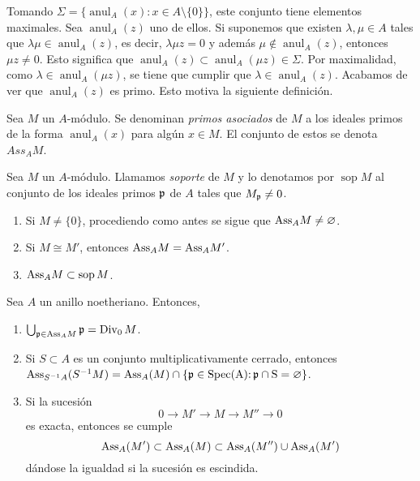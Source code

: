 \documentclass[../main.tex]{subfiles}
\begin{document}
Tomando $\Sigma=\{\operatorname{anul}_A(x):x\in A\setminus\{0\}\}$, este conjunto tiene elementos maximales. Sea $\operatorname{anul}_A(z)$ uno de ellos. Si suponemos que existen $\lambda,\mu\in A$ tales que $\lambda\mu\in\operatorname{anul}_A(z)$, es decir, $\lambda\mu z=0$ y además $\mu\notin\operatorname{anul}_A(z)$, entonces $\mu z\neq0$. Esto significa que $\operatorname{anul}_A(z)\subset\operatorname{anul}_A(\mu z)\in\Sigma$. Por maximalidad, como $\lambda\in\operatorname{anul}_A(\mu z)$, se tiene que cumplir que $\lambda\in\operatorname{anul}_A(z)$. Acabamos de ver que $\operatorname{anul}_A(z)$ es primo. Esto motiva la siguiente definición.
\begin{definition}
Sea $M$ un $A$-módulo. Se denominan \textit{primos asociados} de $M$ a los ideales primos de la forma $\operatorname{anul}_A(x)$ para algún $x\in M$. El conjunto de estos se denota $Ass_AM$.
\end{definition}
\begin{definition}
Sea $M$ un $A$-módulo. Llamamos \textit{soporte} de $M$ y lo denotamos por $\operatorname{sop} M$ al conjunto de los ideales primos $\mathfrak{p}$ de $A$ tales que $M_{\mathfrak{p}}\neq 0$.
\end{definition}
\begin{remark}
\begin{enumerate}
    \item Si $M\neq\{0\}$, procediendo como antes se sigue que $\text{Ass}_AM\neq\varnothing$.
    \item Si $M\cong M'$, entonces $\text{Ass}_AM=\text{Ass}_AM'$.
    \item $\text{Ass}_AM\subset\operatorname{sop}M$.
\end{enumerate}
\end{remark}
\begin{proposition}
Sea $A$ un anillo noetheriano. Entonces,\begin{enumerate}
    \item $\bigcup_{\mathfrak{p}\in\text{Ass}_AM}\mathfrak{p}=\operatorname{Div}_0M$.
    \item Si $S\subset A$ es un conjunto multiplicativamente cerrado, entonces $\text{Ass}_{S^{-1}A}(S^{-1}M)=\text{Ass}_A(M)\cap\{\mathfrak{p}\in\operatorname{Spec(A):\mathfrak{p}\cap S=\varnothing}\}$.
    \item Si la sucesión $$0\longrightarrow M'\longrightarrow M\longrightarrow M''\longrightarrow 0$$ es exacta, entonces se cumple $$\text{Ass}_A(M')\subset\text{Ass}_A(M)\subset\text{Ass}_A(M'')\cup\text{Ass}_A(M')$$ dándose la igualdad si la sucesión es escindida.
\end{enumerate}
\end{proposition}
\end{document}
